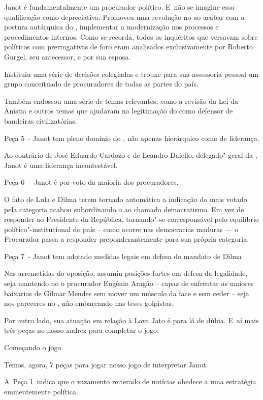 Janot é fundamentalmente um procurador político. E~não se imagine essa
qualificação como depreciativa. Promoveu uma revolução no  ao acabar
com a postura autárquica do , implementar a modernização nos
processos e procedimentos internos. Como se recorda, todos os inquéritos
que versavam sobre políticos com prerrogativas de foro eram analisados
exclusivamente por Roberto Gurgel, seu antecessor, e por sua esposa.

Instituiu uma série de decisões colegiadas e trouxe para sua assessoria
pessoal um grupo conceituado de procuradores de todas as partes do país.

Também endossou uma série de temas relevantes, como a revisão da Lei da
Anistia e outros temas que ajudaram na legitimação do  como defensor
de bandeiras civilizatórias.

Peça 5~- Janot tem pleno domínio do , não apenas hierárquico como de
liderança.

Ao contrário de José Eduardo Cardozo e de Leandro Daiello,
delegado"-geral da , Janot é uma liderança incontestável.

Peça 6~-- Janot é  por voto da maioria dos procuradores.

O fato de Lula e Dilma terem tornado automática a indicação do  mais
votado pela categoria acabou subordinando o  ao chamado democratismo.
Em vez de responder ao Presidente da República, tornando"-se
corresponsável pelo equilíbrio político"-institucional do país -- como
ocorre nas democracias maduras --- o Procurador passa a responder
preponderantemente para sua própria categoria.

Peça 7~- Janot tem adotado medidas legais em defesa do mandato de Dilma

Nas arremetidas da oposição, assumiu posições fortes em defesa da
legalidade, seja mantendo no  o procurador Eugênio Aragão -- capaz de
enfrentar as maiores baixarias de Gilmar Mendes sem mover um músculo da
face e sem ceder -- seja nos pareceres no , não embarcando nas teses
golpistas.

Por outro lado, sua atuação em relação à Lava Jato é para lá de dúbia. E~aí mais três peças no nosso xadrez para completar o jogo:

Começando o jogo

Temos, agora, 7 peças para jogar nosso jogo de interpretar Janot.

A~Peça 1~indica que o vazamento reiterado de notícias obedece a uma
estratégia eminentemente política.

